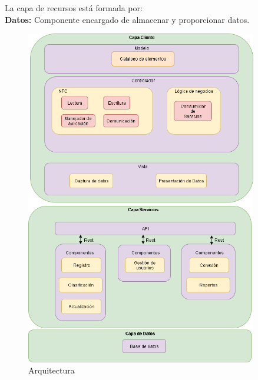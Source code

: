 \documentclass[11pt,openany]{book}
\begin{document}
	La capa de recursos está formada por:\\
	\textbf{Datos: }Componente encargado de almacenar y proporcionar datos.
	\begin{figure}[htbp]
			\centering
			\includegraphics[width=0.9\textwidth]{imagenes/Arquitectura.png}
			\caption{Arquitectura}
			\label{Arquitectura}
	\end{figure}
	\newpage
\end{document}
